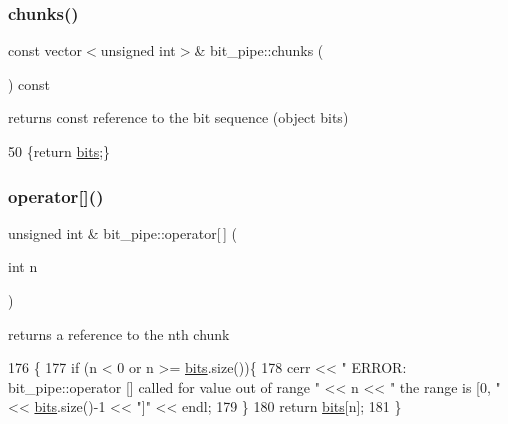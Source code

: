 \subsubsection{\texorpdfstring{chunks()}{chunks()}}
{\footnotesize\ttfamily const vector$<$unsigned int$>$\& bit\+\_\+pipe\+::chunks (\begin{DoxyParamCaption}{ }\end{DoxyParamCaption}) const\hspace{0.3cm}{\ttfamily [inline]}}



returns const reference to the bit sequence (object bits) 


\begin{DoxyCode}
50 \{\textcolor{keywordflow}{return} \hyperlink{classbit__pipe_a86f38af1e9736b053728033490476b50}{bits};\}
\end{DoxyCode}
\mbox{\label{classbit__pipe_a4ea1ac9d3b026ebf3f71a68fccd1d639}} 
\subsubsection{\texorpdfstring{operator[]()}{operator[]()}\hspace{0.1cm}{\footnotesize\ttfamily [1/2]}}
{\footnotesize\ttfamily unsigned int \& bit\+\_\+pipe\+::operator\mbox{[}$\,$\mbox{]} (\begin{DoxyParamCaption}\item[{int}]{n }\end{DoxyParamCaption})}



returns a reference to the nth chunk 


\begin{DoxyCode}
176                                         \{
177   \textcolor{keywordflow}{if} (n < 0 or n >= \hyperlink{classbit__pipe_a86f38af1e9736b053728033490476b50}{bits}.size())\{
178     cerr << \textcolor{stringliteral}{" ERROR: bit\_pipe::operator [] called for value out of range "} << n << \textcolor{stringliteral}{" the range is [0, "} << 
      \hyperlink{classbit__pipe_a86f38af1e9736b053728033490476b50}{bits}.size()-1 << \textcolor{stringliteral}{"]"} << endl;
179   \}
180   \textcolor{keywordflow}{return} \hyperlink{classbit__pipe_a86f38af1e9736b053728033490476b50}{bits}[n];
181 \}
\end{DoxyCode}
\mbox{\label{classbit__pipe_a58c67130ac4b0fd511998f991c8ad58d}} 

